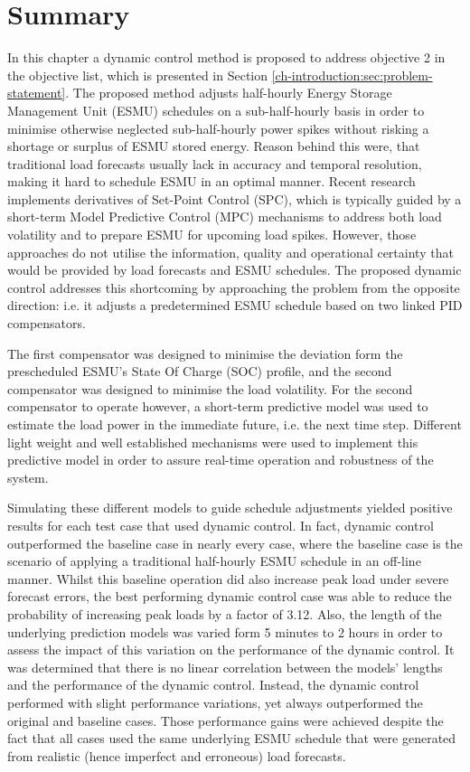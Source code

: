 \section{Summary}
\label{ch2:sec:summary}

In this chapter a dynamic control method is proposed to address objective 2 in the objective list, which is presented in Section \ref{ch-introduction:sec:problem-statement}.
The proposed method adjusts half-hourly Energy Storage Management Unit (ESMU) schedules on a sub-half-hourly basis in order to minimise otherwise neglected sub-half-hourly power spikes without risking a shortage or surplus of ESMU stored energy.
Reason behind this were, that traditional load forecasts usually lack in accuracy and temporal resolution, making it hard to schedule ESMU in an optimal manner.
Recent research implements derivatives of Set-Point Control (SPC), which is typically guided by a short-term Model Predictive Control (MPC) mechanisms to address both load volatility and to prepare ESMU for upcoming load spikes.
However, those approaches do not utilise the information, quality and operational certainty that would be provided by load forecasts and ESMU schedules.
The proposed dynamic control addresses this shortcoming by approaching the problem from the opposite direction: i.e. it adjusts a predetermined ESMU schedule based on two linked PID compensators.

The first compensator was designed to minimise the deviation form the prescheduled ESMU's State Of Charge (SOC) profile, and the second compensator was designed to minimise the load volatility.
For the second compensator to operate however, a short-term predictive model was used to estimate the load power in the immediate future, i.e. the next time step.
Different light weight and well established mechanisms were used to implement this predictive model in order to assure real-time operation and robustness of the system.

Simulating these different models to guide schedule adjustments yielded positive results for each test case that used dynamic control.
In fact, dynamic control outperformed the baseline case in nearly every case, where the baseline case is the scenario of applying a traditional half-hourly ESMU schedule in an off-line manner.
Whilst this baseline operation did also increase peak load under severe forecast errors, the best performing dynamic control case was able to reduce the probability of increasing peak loads by a factor of 3.12.
Also, the length of the underlying prediction models was varied form 5 minutes to 2 hours in order to assess the impact of this variation on the performance of the dynamic control.
It was determined that there is no linear correlation between the models' lengths and the performance of the dynamic control.
Instead, the dynamic control performed with slight performance variations, yet always outperformed the original and baseline cases.
Those performance gains were achieved despite the fact that all cases used the same underlying ESMU schedule that were generated from realistic (hence imperfect and erroneous) load forecasts.

